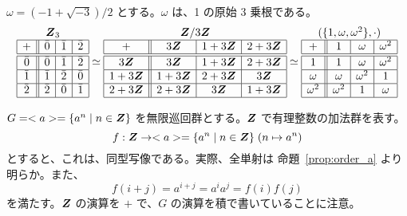 \begin{eg} $\omega = (-1+\sqrt{-3})/2$ とする。$\omega$ は、1 の原始 3 乗根である。
$$\begin{array}{|c||c|c|c|}\multicolumn{4}{c}{\bZ_3}\\
\hline + & \bar{0} & \bar{1} & \bar{2}\\
\hline\hline \bar{0} & \bar{0} & \bar{1} & \bar{2}\\
\hline\bar{1} & \bar{1} & \bar{2} & \bar{0}\\
\hline\bar{2} & \bar{2} & \bar{0} & \bar{1}\\
\hline
\end{array} 
\simeq
\begin{array}{|c||c|c|c|}\multicolumn{4}{c}{\bZ/3\bZ}\\
\hline + & 3\bZ  & 1+3\bZ  & 2+3\bZ \\
\hline\hline 3\bZ  & 3\bZ  & 1+3\bZ  & 2+3\bZ \\
\hline1+3\bZ  & 1+3\bZ  & 2+3\bZ  & 3\bZ \\
\hline2+3\bZ  & 2+3\bZ  & 3\bZ  & 1+3\bZ \\
\hline
\end{array}
\simeq
\begin{array}{|c||c|c|c|}\multicolumn{4}{c}{(\{1,\omega,\omega^2\},\cdot)}\\
\hline + & 1  & \omega  & \omega^2 \\
\hline\hline 1  & 1  & \omega  & \omega^2 \\
\hline\omega  & \omega  & \omega^2  & 1 \\
\hline\omega^2  & \omega^2  & 1  & \omega \\
\hline
\end{array}$$
\end{eg}

\begin{eg}
$G = <a> = \{a^n\mid n\in \mbox{\boldmath $Z$}\}$ を無限巡回群とする。$\mbox{\boldmath $Z$}$ で有理整数の加法群を表す。
$$f : \mbox{\boldmath $Z$} \to <a> = \{a^n\mid n\in \mbox{\boldmath $Z$}\}\;(n\mapsto a^n)$$
とすると、これは、同型写像である。実際、全単射は 命題~\ref{prop:order_a} より明らか。また、
$$f(i + j) = a^{i+j} = a^ia^j = f(i)f(j)$$
を満たす。$\mbox{\boldmath $Z$}$ の演算を $+$ で、$G$ の演算を積で書いていることに注意。
\end{eg}

